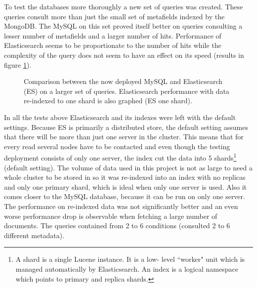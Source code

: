 To test the databases more thoroughly a new set of queries was created. These queries consult more than just the 
small set of metafields indexed by the MongoDB. The MySQL on this set proved itself better on queries consulting
a lesser number of metafields and a larger number of hits. Performance of Elasticsearch seems to be proportionate
to the number of hits while the complexity of the query does not seem to have an effect on its speed (results in 
figure \ref{fig:wide}).

\begin{figure}[h]
	\centering
	
	\caption{Comparison between the now deployed MySQL and Elasticsearch (ES) on a larger set of queries. 
	Elasticsearch performance with data re-indexed to one shard is also graphed (ES one shard).}
	\label{fig:wide}
\end{figure}

In all the tests above Elasticsearch and its indexes were left with the default settings. Because ES is primarily 
a distributed store, the default setting assumes that there will be more than just one server in the cluster. This
means that for every read several nodes have to be contacted and even though the testing deployment consists of 
only one server, the index cut the data into 5 shards\footnote{A shard is a single Lucene instance. It is a low-
level ``worker" unit which is managed automatically by Elasticsearch. An index is a logical namespace which points 
to primary and replica shards.} (default setting). The volume of data used 
in this project is not as large to need a whole cluster to be stored in so it was re-indexed into an index 
with no replicas and only one primary shard, which is ideal when only one server is used. Also it comes closer to 
the MySQL database, because it can be run on only one server. The performance on re-indexed data was not 
significantly better and an even worse performance drop is observable when fetching a large number of documents. 
The queries contained from 2 to 6 conditions (consulted 2 to 6 different metadata).